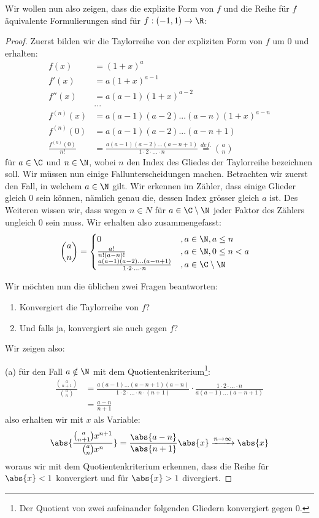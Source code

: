 \begin{example}
Wir wollen nun also zeigen, dass die explizite Form von $f$ und die Reihe für $f$ äquivalente Formulierungen sind für $f: (-1,1) \to \R$:
\begin{proof}
Zuerst bilden wir die Taylorreihe von der expliziten Form von $f$ um 0 und erhalten:
\begin{align*}
    f(x) &= (1+x)^{a}\\
    f'(x) &= a(1+x)^{a-1}\\
    f''(x) &= a(a-1)(1+x)^{a-2}\\
    &...\\
    f^{(n)}(x)&= a(a-1)(a-2)...(a-n)(1+x)^{a-n}\\
    f^{(n)}(0)&= a(a-1)(a-2)...(a-n+1)\\
    \frac{f^{(n)}(0)}{n!} &= \frac{a(a-1)(a-2)...(a-n+1)}{1\cdot2\cdot...\cdot n} \stackrel{def.}{=} \binom{a}{n}
\end{align*}
für $a\in \C$ und $n \in \N$, wobei $n$ den Index des Gliedes der Taylorreihe bezeichnen soll. Wir müssen nun einige Fallunterscheidungen machen. Betrachten wir zuerst den Fall, in welchem $a \in \N$ gilt. Wir erkennen im Zähler, dass einige Glieder gleich $0$ sein können, nämlich genau die, dessen Index grösser gleich $a$ ist. Des Weiteren wissen wir, dass wegen $n \in N$ für $a \in \C \setminus \N$ jeder Faktor des Zählers ungleich 0 sein muss. Wir erhalten also zusammengefasst:
\begin{align}\label{eq_binomial_cases}
    \binom{a}{n} &= \begin{cases} 0 & , a \in \N, a \leq n \\
    \frac{a!}{n!(a-n)!} & , a \in \N, 0 \leq n < a \\
    \frac{a(a-1)(a-2)...(a-n+1)}{1\cdot2\cdot...\cdot n} & , a \in \C \setminus \N \end{cases}
\end{align}

Wir möchten nun die üblichen zwei Fragen beantworten: 
\begin{enumerate}[label=(\alph*)]
    \item Konvergiert die Taylorreihe von $f$?
    \item Und falls ja, konvergiert sie auch gegen $f$?
\end{enumerate}

Wir zeigen also:

(a) für den Fall $a \notin \N$ mit dem Quotientenkriterium\footnote{Der Quotient von zwei aufeinander folgenden Gliedern konvergiert gegen 0.}:
\begin{align}\label{eq_binomial_identity}
    \frac{\binom{a}{n+1}}{\binom{a}{n}} &= \frac{a(a-1)...(a-n+1)(a-n)}{1\cdot2\cdot...\cdot n \cdot (n+1)} \cdot \frac{1\cdot2\cdot...\cdot \nonumber n}{a(a-1)...(a-n+1)}\\
    &= \frac{a-n}{n+1}
\end{align}
also erhalten wir mit $x$ als Variable:
$$\abs{ \frac{\binom{a}{n+1}x^{n+1}}{\binom{a}{n}x^n}} = \frac{\abs{a-n}}{\abs{n+1}}\abs{x} \xrightarrow{n \to \infty} \abs{x}$$
woraus wir mit dem Quotientenkriterium erkennen, dass die Reihe für $\abs{x} < 1$ konvergiert und für $\abs{x} > 1$ divergiert.


\end{proof}
\end{example}
